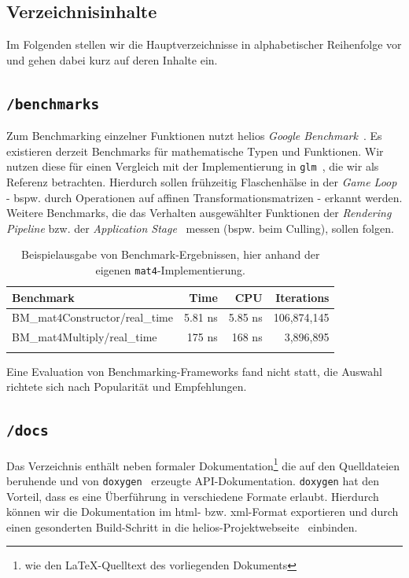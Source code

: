 \subsection{Verzeichnisinhalte}

Im Folgenden stellen wir die Hauptverzeichnisse in alphabetischer Reihenfolge vor und gehen dabei kurz auf deren Inhalte ein.


\subsection*{\texttt{/benchmarks}}
Zum Benchmarking einzelner Funktionen nutzt helios \textit{Google Benchmark}~\cite[]{googlebenchmarkgithub}.
Es existieren derzeit Benchmarks für mathematische Typen und Funktionen.
Wir nutzen diese für einen Vergleich mit der Implementierung in \texttt{glm}~\cite[]{glmGithub}, die wir als Referenz betrachten.
Hierdurch sollen frühzeitig Flaschenhälse in der \textit{Game Loop} - bspw. durch Operationen auf affinen Transformationsmatrizen - erkannt werden.
Weitere Benchmarks, die das Verhalten ausgewählter Funktionen der \textit{Rendering Pipeline} bzw. der \textit{Application Stage}~\cite[687]{Gre19} messen (bspw. beim Culling), sollen folgen.




\setlength{\tabcolsep}{8pt}
\begin{table}[t]
    \centering
    {\renewcommand{\arraystretch}{1.2}%
    \begin{tabular}{lrrr}
        \hline
        \textbf{Benchmark} & \textbf{Time} & \textbf{CPU} & \textbf{Iterations} \\
        \hline
        BM\_mat4Constructor/real\_time         & 5.81 ns  & 5.85 ns  & 106{,}874{,}145 \\
        BM\_mat4Multiply/real\_time            & 175 ns   & 168 ns   & 3{,}896{,}895 \\
        \hline\\
    \end{tabular}}
    \caption{Beispielausgabe von Benchmark-Ergebnissen, hier anhand der eigenen \texttt{mat4}-Implementierung.}
    \label{tab:mat4-benchmark}
\end{table}


Eine Evaluation von Benchmarking-Frameworks fand nicht statt, die Auswahl richtete sich nach Popularität und Empfehlungen.

\subsection*{\texttt{/docs}}
Das Verzeichnis enthält neben formaler Dokumentation\footnote{wie den \LaTeX-Quelltext des vorliegenden Dokuments} die auf den Quelldateien beruhende und von \texttt{doxygen}~\cite[]{Doxygen} erzeugte API-Dokumentation.
\texttt{doxygen} hat den Vorteil, dass es eine Überführung in verschiedene Formate erlaubt.
Hierdurch können wir die Dokumentation im html- bzw. xml-Format exportieren und durch einen gesonderten Build-Schritt in die helios-Projektwebseite~\cite[]{helios} einbinden.\par

